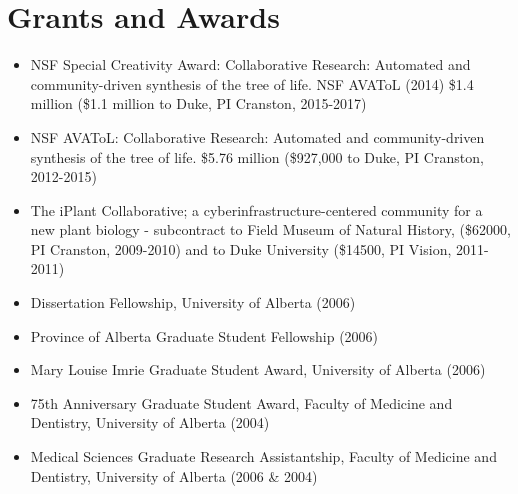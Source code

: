 \documentclass[10pt]{article}
\begin{document}
\section*{Grants and Awards}
\begin{itemize}
\item{NSF Special Creativity Award: Collaborative Research: Automated and community-driven synthesis of the tree of life. NSF AVAToL (2014) \$1.4 million (\$1.1 million to Duke, PI Cranston, 2015-2017)}
\item{NSF AVAToL: Collaborative Research: Automated and community-driven synthesis of the tree of life. \$5.76 million (\$927,000 to Duke, PI Cranston, 2012-2015)}
\item{The iPlant Collaborative; a cyberinfrastructure-centered community for a new plant biology - subcontract to Field Museum of Natural History, (\$62000, PI Cranston, 2009-2010) and to Duke University (\$14500, PI Vision, 2011-2011)}
\item{Dissertation Fellowship, University of Alberta (2006)}
\item{Province of Alberta Graduate Student Fellowship (2006)}
\item{Mary Louise Imrie Graduate Student Award, University of Alberta (2006)}
\item{75th Anniversary Graduate Student Award, Faculty of Medicine and Dentistry, University of Alberta (2004)}
\item{Medical Sciences Graduate Research Assistantship, Faculty of Medicine and Dentistry, University of Alberta (2006 \& 2004)}
\end{itemize}

\end{document}

